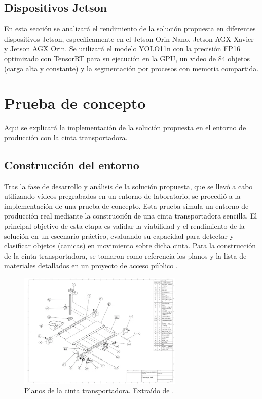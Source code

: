 \documentclass[11pt,spanish,listoffigures,listoftables]{tfgetsinf}
\begin{document}
\section{Dispositivos Jetson} \label{sec:dispositivos_jetson}
En esta sección se analizará el rendimiento de la solución propuesta en diferentes dispositivos Jetson, específicamente en el Jetson Orin Nano, Jetson AGX Xavier  y Jetson AGX Orin. Se utilizará el modelo YOLO11n con la precisión FP16 optimizado con TensorRT para su ejecución en la GPU, un video de 84 objetos (carga alta y constante) y la segmentación por procesos con memoria compartida.

\chapter{Prueba de concepto} \label{chap:prueba_concepto}
Aqui se explicará la implementación de la solución propuesta en el entorno de producción con la cinta transportadora.

\section{Construcción del entorno} \label{sub:construccion_entorno}
Tras la fase de desarrollo y análisis de la solución propuesta, que se llevó a cabo utilizando vídeos pregrabados en un entorno de laboratorio, se procedió a la implementación de una prueba de concepto. Esta prueba simula un entorno de producción real mediante la construcción de una cinta transportadora sencilla. El principal objetivo de esta etapa es validar la viabilidad y el rendimiento de la solución en un escenario práctico, evaluando su capacidad para detectar y clasificar objetos (canicas) en movimiento sobre dicha cinta. Para la construcción de la cinta transportadora, se tomaron como referencia los planos y la lista de materiales detallados en un proyecto de acceso público \cite{hackster_counting_inspection}.

\begin{figure}[H]
   \centering
   \includegraphics[width=0.7\textwidth]{images/prueba_de_concepto/planos_cinta.png}
   \caption[Planos de la cinta transportadora]{Planos de la cinta transportadora. Extraído de \cite{hackster_counting_inspection}.}
   \label{fig:planos_cinta}
\end{figure}
\end{document}
